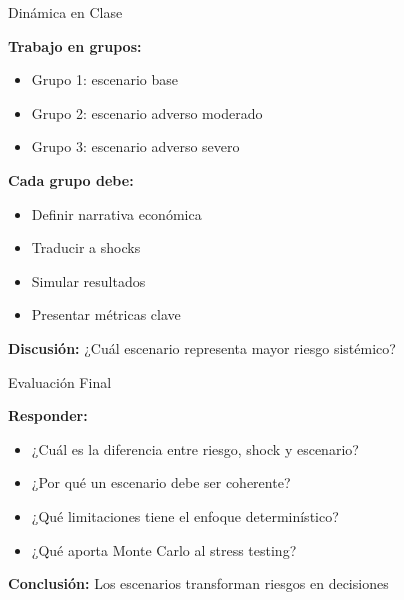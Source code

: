 \documentclass{beamer}
\begin{document}
\begin{frame}{Dinámica en Clase}

\textbf{Trabajo en grupos:}

\begin{itemize}
\item Grupo 1: escenario base
\item Grupo 2: escenario adverso moderado
\item Grupo 3: escenario adverso severo
\end{itemize}

\vspace{0.4cm}

\textbf{Cada grupo debe:}
\begin{itemize}
\item Definir narrativa económica
\item Traducir a shocks
\item Simular resultados
\item Presentar métricas clave
\end{itemize}

\vspace{0.4cm}

\textbf{Discusión:}
¿Cuál escenario representa mayor riesgo sistémico?

\end{frame}

\begin{frame}{Evaluación Final}

\textbf{Responder:}

\begin{itemize}
\item ¿Cuál es la diferencia entre riesgo, shock y escenario?
\item ¿Por qué un escenario debe ser coherente?
\item ¿Qué limitaciones tiene el enfoque determinístico?
\item ¿Qué aporta Monte Carlo al stress testing?
\end{itemize}

\vspace{0.5cm}

\centering
\textbf{Conclusión:}  
Los escenarios transforman riesgos en decisiones

\end{frame}

\end{document}
